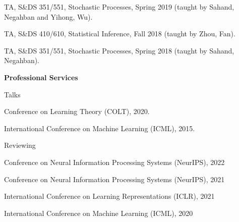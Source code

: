 \documentclass{article}
\begin{document}
\vspace{2mm}
TA, S\&{DS} 351/551, Stochastic Processes, Spring 2019 (taught by Sahand, Negahban and Yihong, Wu). 

\vspace{2mm}
TA, S\&{DS} 410/610, Statistical Inference, Fall 2018 (taught by Zhou, Fan). 

\vspace{2mm}
TA, S\&{DS} 351/551, Stochastic Processes, Spring 2018 (taught by Sahand, Negahban). 



\vspace{5mm}
\begin{large}
\noindent \textbf{Professional Services}
\end{large}
\vspace{5mm}

\begin{large}
\noindent Talks
\end{large}


\vspace{2mm}
Conference on Learning Theory (COLT), 2020.

\vspace{2mm}
International Conference on Machine Learning (ICML), 2015.



\vspace{2mm}

\begin{large}
\noindent Reviewing
\end{large}

\vspace{2mm}
Conference on Neural Information Processing Systems (NeurIPS), 2022

\vspace{2mm}
Conference on Neural Information Processing Systems (NeurIPS), 2021

\vspace{2mm}
International Conference on Learning Representations (ICLR), 2021

\vspace{2mm}
International Conference on Machine Learning (ICML), 2020






\end{document}
